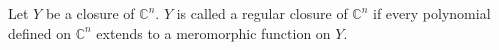 Let $Y$ be a closure of $\mathbb{C}^n$. $Y$ is called a regular closure of $\mathbb{C}^n$ if every polynomial defined on $\mathbb{C}^n$ extends to a meromorphic function on $Y$.
